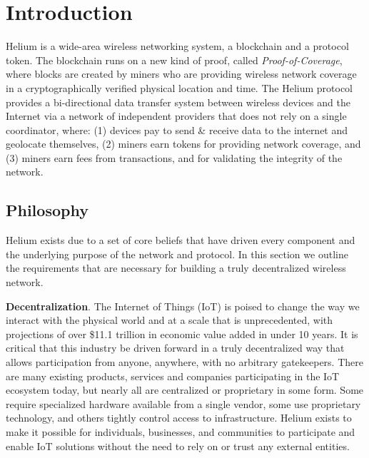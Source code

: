 \documentclass[letterpaper,11pt]{article}
\def\proofofcoverage/{\textit{Proof-of-Coverage}}
\begin{document}
\newpage

\tableofcontents
\newpage

\section{Introduction}

Helium is a wide-area wireless networking system, a blockchain and a protocol token. The blockchain runs on a new kind of proof, called \proofofcoverage/, where blocks are created by miners who are providing wireless network coverage in a cryptographically verified physical location and time. The Helium protocol provides a bi-directional data transfer system between wireless devices and the Internet via a network of independent providers that does not rely on a single coordinator, where: (1) devices pay to send \& receive data to the internet and geolocate themselves, (2) miners earn tokens for providing network coverage, and (3) miners earn fees from transactions, and for validating the integrity of the network.

\subsection{Philosophy}

Helium exists due to a set of core beliefs that have driven every component and the underlying purpose of the network and protocol. In this section we outline the requirements that are necessary for building a truly decentralized wireless network.\newline

\textbf{Decentralization}. The Internet of Things (IoT) is poised to change the way we interact with the physical world and at a scale that is unprecedented, with projections of over \$11.1 trillion in economic value added in under 10 years\cite{mckinsey}. It is critical that this industry be driven forward in a truly decentralized way that allows participation from anyone, anywhere, with no arbitrary gatekeepers. There are many existing products, services and companies participating in the IoT ecosystem today, but nearly all are centralized or proprietary in some form. Some require specialized hardware available from a single vendor, some use proprietary technology, and others tightly control access to infrastructure. Helium exists to make it possible for individuals, businesses, and communities to participate and enable IoT solutions without the need to rely on or trust any external entities.\newline
\end{document}

